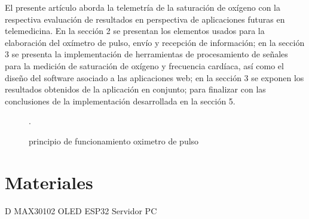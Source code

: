 \documentclass[journal]{IEEEtran}
\begin{document}
El presente artículo aborda la telemetría de la saturación de oxígeno con la respectiva evaluación de resultados en perspectiva de aplicaciones futuras en telemedicina. En la sección 2 se presentan los elementos usados para la elaboración del oxímetro de pulso, envío y recepción de información; en la sección 3 se presenta la implementación de herramientas de procesamiento de señales para la medición de saturación de oxígeno y frecuencia cardíaca, así como el diseño del software asociado a las aplicaciones web; en la sección 3 se exponen los resultados obtenidos de la aplicación en conjunto; para finalizar con las conclusiones  de la implementación desarrollada en la sección 5.




\begin{figure}[!h]
	\centering
	\caption{principio de funcionamiento oximetro de pulso \cite{physiobank} }.
	
	\label{imagen_ecg}
\end{figure}





\section{Materiales}

{\color{blue}D}
\newline
MAX30102
\newline
OLED
\newline
ESP32
\newline
Servidor
\newline
PC

\end{document}
